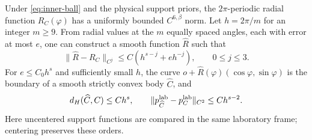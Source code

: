 \begin{lemma}
\label{lem:radial}
Under \eqref{eq:inner-ball} and the physical support priors, the
$2\pi$-periodic radial function $R_C(\varphi)$ has a uniformly bounded
$C^{6,\beta}$ norm. Let $h=2\pi/m$ for an integer $m\ge9$. From
radial values at the $m$ equally spaced angles, each with error at most
$e$, one can construct a smooth function $\widehat R$ such that
\begin{equation}\label{eq:radial-interpolation}
 \|\widehat R-R_C\|_{C^j}
           \le C(h^{s-j}+e h^{-j}),\qquad 0\le j\le3.
\end{equation}
For $e\le C_0h^s$ and sufficiently small $h$, the curve
$o+\widehat R(\varphi)(\cos\varphi,\sin\varphi)$ is the boundary of
a smooth strictly convex body $\widehat C$, and
\begin{equation}\label{eq:geometric-interpolation}
 d_H(\widehat C,C)\le Ch^s,\qquad
 \|p_{\widehat C}^{\rm lab}-p_C^{\rm lab}\|_{C^2}\le Ch^{s-2}.
\end{equation}
Here uncentered support functions are compared in the same laboratory
frame; centering preserves these orders.
\end{lemma}
